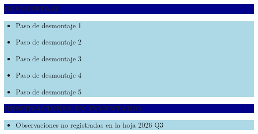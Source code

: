 \documentclass[11pt]{article}
\newcommand{\seccionbanda}[1]{%
  \vspace{0.6em}
  \noindent\colorbox{darkblue}{\parbox{\dimexpr\linewidth-2\fboxsep}{%
    \centering\color{white}\bfseries #1}}\par\vspace{0.6em}
}
\begin{document}
\seccionbanda{DESMONTAJE}
\noindent\colorbox{lightblue}{\parbox{\dimexpr\linewidth-2\fboxsep\relax}{%
\begin{itemize}[label=$\square$, itemsep=4pt]
\item Paso de desmontaje 1
\item Paso de desmontaje 2
\item Paso de desmontaje 3
\item Paso de desmontaje 4
\item Paso de desmontaje 5
\end{itemize}
}}\par
\seccionbanda{OBSERVACIONES EN INVENTARIO}
\noindent\colorbox{lightblue}{\parbox{\dimexpr\linewidth-2\fboxsep\relax}{\begin{itemize}[itemsep=4pt]
\item Observaciones no registradas en la hoja 2026 Q3
\end{itemize}}}\par
\end{document}
